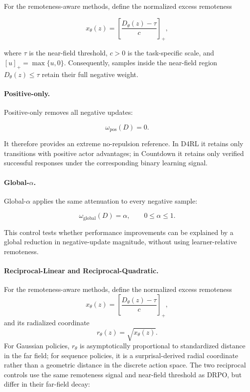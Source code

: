 \documentclass[sigconf,anonymous,review]{acmart}
\theoremstyle{acmdefinition}
\begin{document}
For the remoteness-aware methods, define the normalized excess
remoteness

\[
x_\theta(z)
=
\left[
\frac{D_\theta(z)-\tau}{c}
\right]_{+},
\]

where \(\tau\) is the near-field threshold, \(c>0\) is the task-specific
scale, and \([u]_{+}=\max\{u,0\}\). Consequently, samples inside the
near-field region \(D_\theta(z)\leq\tau\) retain their full negative
weight.

\paragraph{Positive-only.}

Positive-only removes all negative updates:

\[
\omega_{\mathrm{pos}}(D)=0.
\]

It therefore provides an extreme no-repulsion reference. In D4RL it
retains only transitions with positive actor advantages; in Countdown
it retains only verified successful responses under the corresponding
binary learning signal.

\paragraph{Global-\(\alpha\).}

Global-\(\alpha\) applies the same attenuation to every negative sample:

\[
\omega_{\mathrm{global}}(D)=\alpha,
\qquad
0\leq\alpha\leq 1.
\]

This control tests whether performance improvements can be explained by
a global reduction in negative-update magnitude, without using
learner-relative remoteness.

\paragraph{Reciprocal-Linear and Reciprocal-Quadratic.}
For the remoteness-aware methods, define the normalized excess
remoteness
\[
x_\theta(z)
=
\left[
\frac{D_\theta(z)-\tau}{c}
\right]_{+},
\]
and its radialized coordinate
\[
r_\theta(z)=\sqrt{x_\theta(z)}.
\]
For Gaussian policies, \(r_\theta\) is asymptotically proportional to
standardized distance in the far field; for sequence policies, it is a
surprisal-derived radial coordinate rather than a geometric distance in
the discrete action space.
The two reciprocal controls use the same remoteness signal and
near-field threshold as DRPO, but differ in their far-field decay:
\end{document}
